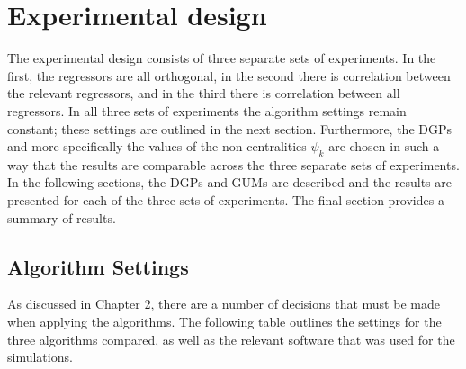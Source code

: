 



 





\section{Experimental design}

The experimental design consists of three separate sets of experiments. In the first, the regressors are all orthogonal, in the second there is correlation between the relevant regressors, and in the third there is correlation between all regressors. In all three sets of experiments the algorithm settings remain constant; these settings are outlined in the next section. Furthermore, the DGPs and more specifically the values of the non-centralities $\psi_{k}$ are chosen in such a way that the results are comparable across the three separate sets of experiments. In the following sections, the DGPs and GUMs are described and the results are presented for each of the three sets of experiments. The final section provides a summary of results.

\subsection{Algorithm Settings}

As discussed in Chapter 2, there are a number of decisions that must be made when applying the algorithms. The following table outlines the settings for the three algorithms compared, as well as the relevant software that was used for the simulations.

